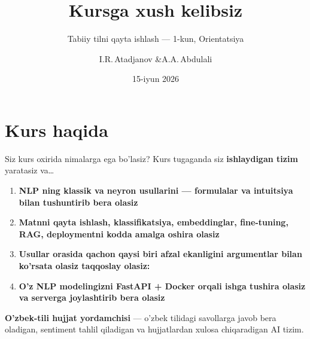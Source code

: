 \documentclass[aspectratio=169,11pt]{beamer}
\title[Orientatsiya]{Kursga xush kelibsiz}
\subtitle{Tabiiy tilni qayta ishlash --- 1-kun, Orientatsiya}
\author[I.R.\,Atadjanov]{I.R.\,Atadjanov \quad\&\quad A.A.\,Abdulali}
\date{15-iyun 2026}
\institute{09:30--10:50 \quad$\cdot$\quad Orientatsiya va muhit sozlash}
\begin{document}

\maketitle

\section[Kurs haqida]{Kurs haqida}

\begin{frame}{Siz kurs oxirida nimalarga ega bo'lasiz?}
  Kurs tugaganda siz \textbf{ishlaydigan tizim} yaratasiz va\ldots
  \begin{enumerate}\setlength\itemsep{6pt}
    \item \textbf{NLP ning klassik va neyron usullarini --- formulalar va intuitsiya bilan tushuntirib bera olasiz}
    \item \textbf{Matnni qayta ishlash,
          klassifikatsiya, embeddinglar, fine-tuning, RAG, deploymentni kodda amalga oshira olasiz}
    \item \textbf{Usullar orasida qachon qaysi biri
          afzal ekanligini argumentlar bilan ko'rsata olasiz taqqoslay olasiz:}
    \item \textbf{O'z NLP modelingizni
          FastAPI + Docker orqali ishga tushira olasiz va serverga joylashtirib bera olasiz}
  \end{enumerate}
  \vspace{0.4em}
  \begin{tcolorbox}[okbox,title=Siz yaratidagn yakuniy mahsulot]
    \small \textbf{O'zbek-tili hujjat yordamchisi} ---
    o'zbek tilidagi savollarga javob bera oladigan,
    sentiment tahlil qiladigan va hujjatlardan xulosa chiqaradigan AI tizim.
  \end{tcolorbox}
\end{frame}
\end{document}

